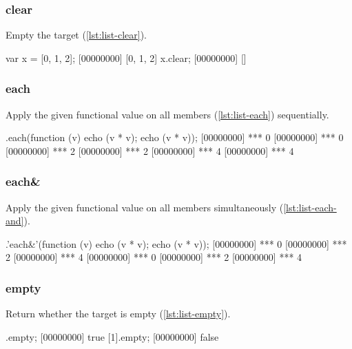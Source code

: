 \subsubsection{clear}

Empty the target (\autoref{lst:list-clear}).

\begin{urbiscript}[caption=List.clear, label=lst:list-clear, float=\floatposh]
var x = [0, 1, 2];
[00000000] [0, 1, 2]
x.clear;
[00000000] []
\end{urbiscript}

\subsubsection{each}

Apply the given functional value on all members (\autoref{lst:list-each})
sequentially.

\begin{urbiscript}[caption=List.each, label=lst:list-each, float=\floatposh]
[0, 1, 2].each(function (v) {echo (v * v); echo (v * v)});
[00000000] *** 0
[00000000] *** 0
[00000000] *** 2
[00000000] *** 2
[00000000] *** 4
[00000000] *** 4
\end{urbiscript}

\subsubsection{each\&}

Apply the given functional value on all members simultaneously
(\autoref{lst:list-each-and}).

\begin{urbiscript}[caption=List.each, label=lst:list-each-and, float=\floatposh]
[0, 1, 2].'each&'(function (v) {echo (v * v); echo (v * v)});
[00000000] *** 0
[00000000] *** 2
[00000000] *** 4
[00000000] *** 0
[00000000] *** 2
[00000000] *** 4
\end{urbiscript}

\subsubsection{empty}

Return whether the target is empty (\autoref{lst:list-empty}).

\begin{urbiscript}[caption=List.empty, label=lst:list-empty, float=\floatposh]
[].empty;
[00000000] true
[1].empty;
[00000000] false
\end{urbiscript}

